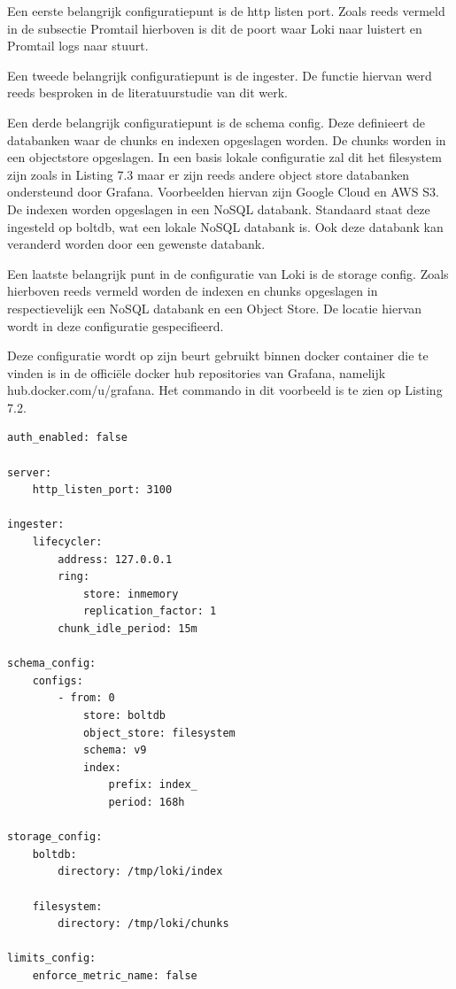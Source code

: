 Een eerste belangrijk configuratiepunt is de http listen port. Zoals reeds vermeld in de subsectie Promtail hierboven is dit de poort waar Loki naar luistert en Promtail logs naar stuurt. 

Een tweede belangrijk configuratiepunt is de ingester. De functie hiervan werd reeds besproken in de literatuurstudie van dit werk. 

Een derde belangrijk configuratiepunt is de schema config. Deze definieert de databanken waar de chunks en indexen opgeslagen worden. De chunks worden in een objectstore opgeslagen. In een basis lokale configuratie zal dit het filesystem zijn zoals in Listing 7.3 maar er zijn reeds andere object store databanken ondersteund door Grafana. Voorbeelden hiervan zijn Google Cloud en AWS S3. De indexen worden opgeslagen in een NoSQL databank. Standaard staat deze ingesteld op boltdb, wat een lokale NoSQL databank is. Ook deze databank kan veranderd worden door een gewenste databank.

Een laatste belangrijk punt in de configuratie van Loki is de storage config. Zoals hierboven reeds vermeld worden de indexen en chunks opgeslagen in respectievelijk een NoSQL databank en een Object Store. De locatie hiervan wordt in deze configuratie gespecifieerd.

Deze configuratie wordt op zijn beurt gebruikt binnen docker container die te vinden is in de officiële docker hub repositories van Grafana, namelijk hub.docker.com/u/grafana. Het commando in dit voorbeeld is te zien op Listing 7.2.

\begin{lstlisting}[caption=Loki config yaml file]
auth_enabled: false

server:
    http_listen_port: 3100

ingester:
    lifecycler:
        address: 127.0.0.1
        ring:
            store: inmemory
            replication_factor: 1
        chunk_idle_period: 15m

schema_config:
    configs:
        - from: 0
            store: boltdb
            object_store: filesystem
            schema: v9
            index:
                prefix: index_
                period: 168h

storage_config:
    boltdb:
        directory: /tmp/loki/index

    filesystem:
        directory: /tmp/loki/chunks

limits_config:
    enforce_metric_name: false
\end{lstlisting}

